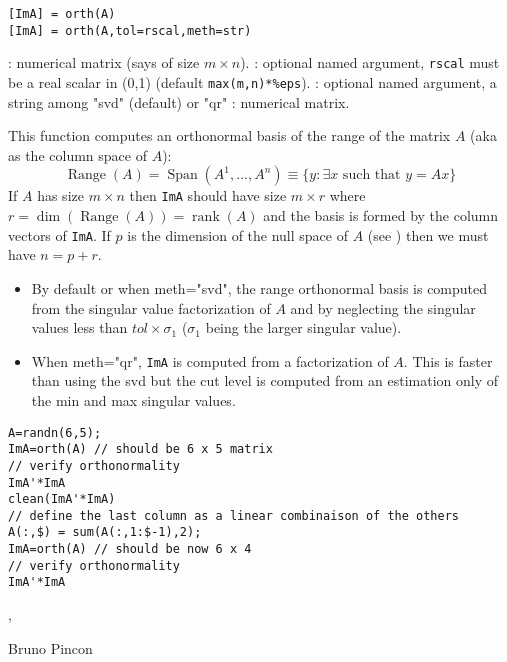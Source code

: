 \begin{mandesc}
\end{mandesc}
\begin{calling_sequence}
\begin{verbatim}
[ImA] = orth(A) 
[ImA] = orth(A,tol=rscal,meth=str) 
\end{verbatim}
\end{calling_sequence}
\begin{parameters}
  \begin{varlist}
    :  numerical matrix (says of size $m \times n$).
    : optional named argument, \verb+rscal+ must be  a real scalar in (0,1) (default \verb+max(m,n)*%eps+).
    : optional named argument, a string among "svd" (default) or "qr"
    : numerical matrix.
  \end{varlist}
\end{parameters}
\begin{mandescription}
This function computes an orthonormal basis of the range of the
matrix $A$ (aka as the column space of $A$):
$$
\mathop{\mathrm{Range}}(A) = \mathop{\mathrm{Span}}(A^1,...,A^n) \equiv \{ y : \exists x \text{ such that } y = Ax \}  
$$
 If $A$ has size $m \times n$ then \verb+ImA+ should have 
size $m \times r$ where $r = \mathop{\mathrm{dim}}(\mathop{\mathrm{Range}}(A)) = \mathop{\mathrm{rank}}(A)$
and the basis is formed by the column vectors of \verb+ImA+.
 If $p$ is the dimension of the null space of $A$ (see )
then we must have $n = p + r$.
\begin{itemize}
\item By default or when  meth="svd", the range orthonormal basis 
is computed from the singular value factorization of $A$ and by 
neglecting the singular values less than $tol \times \sigma_1$
($\sigma_1$ being the larger singular value). 
\item When  meth="qr", \verb+ImA+ is computed from a  
factorization of $A$. This is faster than using the svd but 
the cut level is computed from an estimation only of the min 
and max singular values.
\end{itemize}
\end{mandescription}

\begin{examples}
\begin{Verbatim}
A=randn(6,5);
ImA=orth(A) // should be 6 x 5 matrix 
// verify orthonormality  
ImA'*ImA 
clean(ImA'*ImA) 
// define the last column as a linear combinaison of the others
A(:,$) = sum(A(:,1:$-1),2);
ImA=orth(A) // should be now 6 x 4 
// verify orthonormality  
ImA'*ImA
\end{Verbatim}
\end{examples}

\begin{manseealso}
   ,   
\end{manseealso}

\begin{authors}
   Bruno Pincon
\end{authors}
